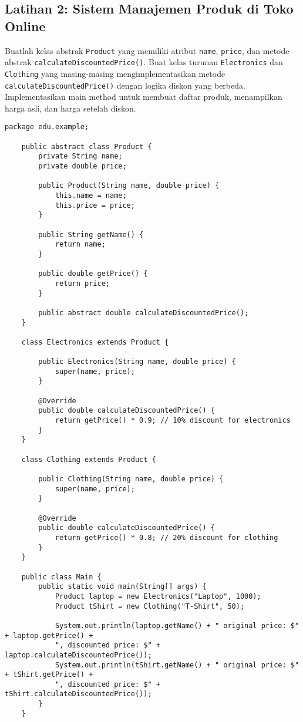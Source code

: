 \subsection{Latihan 2: Sistem Manajemen Produk di Toko Online}

Buatlah kelas abstrak \texttt{Product} yang memiliki atribut \texttt{name}, \texttt{price}, dan metode abstrak \texttt{calculateDiscountedPrice()}. Buat kelas turunan \texttt{Electronics} dan \texttt{Clothing} yang masing-masing mengimplementasikan metode \texttt{calculateDiscountedPrice()} dengan logika diskon yang berbeda. Implementasikan main method untuk membuat daftar produk, menampilkan harga asli, dan harga setelah diskon.

\begin{lstlisting}[style=JavaStyle]
	package edu.example;
	
	public abstract class Product {
		private String name;
		private double price;
		
		public Product(String name, double price) {
			this.name = name;
			this.price = price;
		}
		
		public String getName() {
			return name;
		}
		
		public double getPrice() {
			return price;
		}
		
		public abstract double calculateDiscountedPrice();
	}
	
	class Electronics extends Product {
		
		public Electronics(String name, double price) {
			super(name, price);
		}
		
		@Override
		public double calculateDiscountedPrice() {
			return getPrice() * 0.9; // 10% discount for electronics
		}
	}
	
	class Clothing extends Product {
		
		public Clothing(String name, double price) {
			super(name, price);
		}
		
		@Override
		public double calculateDiscountedPrice() {
			return getPrice() * 0.8; // 20% discount for clothing
		}
	}
	
	public class Main {
		public static void main(String[] args) {
			Product laptop = new Electronics("Laptop", 1000);
			Product tShirt = new Clothing("T-Shirt", 50);
			
			System.out.println(laptop.getName() + " original price: $" + laptop.getPrice() + 
			", discounted price: $" + laptop.calculateDiscountedPrice());
			System.out.println(tShirt.getName() + " original price: $" + tShirt.getPrice() + 
			", discounted price: $" + tShirt.calculateDiscountedPrice());
		}
	}
\end{lstlisting}

